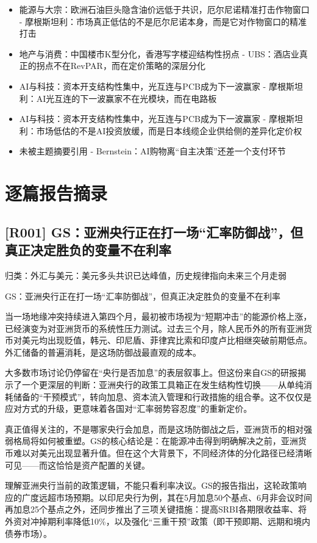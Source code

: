 \documentclass[11pt]{ctexart}
\begin{document}
\begin{itemize}
  \item [R030] 能源与大宗：欧洲石油巨头隐含油价远低于共识，厄尔尼诺精准打击作物窗口 - 摩根斯坦利：市场真正低估的不是厄尔尼诺本身，而是它对作物窗口的精准打击
  \item [R031] 地产与消费：中国楼市K型分化，香港写字楼迎结构性拐点 - UBS：酒店业真正的拐点不在RevPAR，而在定价策略的深层分化
  \item [R032] AI与科技：资本开支结构性集中，光互连与PCB成为下一波赢家 - 摩根斯坦利：AI光互连的下一波赢家不在光模块，而在电路板
  \item [R033] AI与科技：资本开支结构性集中，光互连与PCB成为下一波赢家 - 摩根斯坦利：市场低估的不是AI投资放缓，而是日本线缆企业供给侧的差异化定价权
  \item [R034] 未被主题摘要引用 - Bernstein：AI购物离“自主决策”还差一个支付环节
\end{itemize}
\section{逐篇报告摘录}
\subsection{[R001] GS：亚洲央行正在打一场“汇率防御战”，但真正决定胜负的变量不在利率}
{\small\color{refgray}归类：外汇与美元：美元多头共识已达峰值，历史规律指向未来三个月走弱}

GS：亚洲央行正在打一场“汇率防御战”，但真正决定胜负的变量不在利率

当一场地缘冲突持续进入第四个月，最初被市场视为“短期冲击”的能源价格上涨，已经演变为对亚洲货币的系统性压力测试。过去三个月，除人民币外的所有亚洲货币对美元均出现贬值，韩元、印尼盾、菲律宾比索和印度卢比相继突破前期低点。外汇储备的普遍消耗，是这场防御战最直观的成本。

大多数市场讨论仍停留在“央行是否加息”的表层叙事上。但这份来自GS的研报揭示了一个更深层的判断：亚洲央行的政策工具箱正在发生结构性切换——从单纯消耗储备的“干预模式”，转向加息、资本流入管理和行政措施的组合拳。这不仅仅是应对方式的升级，更意味着各国对“汇率弱势容忍度”的重新定价。

真正值得关注的，不是哪家央行会加息，而是这场防御战之后，亚洲货币的相对强弱格局将如何被重塑。GS的核心结论是：在能源冲击得到明确解决之前，亚洲货币难以对美元出现显著升值。但在这个大背景下，不同经济体的分化路径已经清晰可见——而这恰恰是资产配置的关键。

理解亚洲央行当前的政策逻辑，不能只看利率决议。GS的报告指出，这轮政策响应的广度远超市场预期。以印尼央行为例，其在5月加息50个基点、6月非会议时间再加息25个基点之外，还同步推出了三项关键措施：提高SRBI各期限收益率、将外资对冲掉期利率降低10\%，以及强化“三重干预”政策（即干预即期、远期和境内债券市场）。
\end{document}
